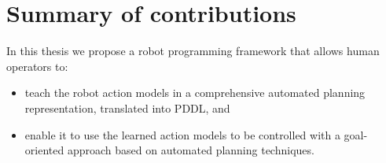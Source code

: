 \section{Summary of contributions}
In this thesis we propose a robot programming framework that allows human operators to:
\begin{itemize}
	\item teach the robot action models in a comprehensive automated planning representation, translated into PDDL, and
	\item enable it to use the learned action models to be controlled with a goal-oriented approach based on automated planning techniques.
\end{itemize}

